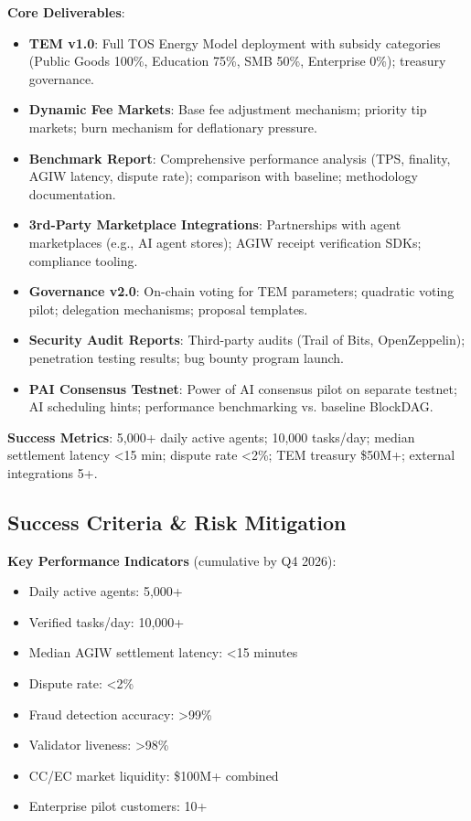 \documentclass[11pt]{article}
\begin{document}
\textbf{Core Deliverables}:
\begin{itemize}[noitemsep]
  \item \textbf{TEM v1.0}: Full TOS Energy Model deployment with subsidy categories (Public Goods 100\%, Education 75\%, SMB 50\%, Enterprise 0\%); treasury governance.
  \item \textbf{Dynamic Fee Markets}: Base fee adjustment mechanism; priority tip markets; burn mechanism for deflationary pressure.
  \item \textbf{Benchmark Report}: Comprehensive performance analysis (TPS, finality, AGIW latency, dispute rate); comparison with baseline; methodology documentation.
  \item \textbf{3rd-Party Marketplace Integrations}: Partnerships with agent marketplaces (e.g., AI agent stores); AGIW receipt verification SDKs; compliance tooling.
  \item \textbf{Governance v2.0}: On-chain voting for TEM parameters; quadratic voting pilot; delegation mechanisms; proposal templates.
  \item \textbf{Security Audit Reports}: Third-party audits (Trail of Bits, OpenZeppelin); penetration testing results; bug bounty program launch.
  \item \textbf{PAI Consensus Testnet}: Power of AI consensus pilot on separate testnet; AI scheduling hints; performance benchmarking vs. baseline BlockDAG.
\end{itemize}

\textbf{Success Metrics}: 5,000+ daily active agents; 10,000 tasks/day; median settlement latency <15 min; dispute rate <2\%; TEM treasury \$50M+; external integrations 5+.

\subsection{Success Criteria \& Risk Mitigation}

\textbf{Key Performance Indicators} (cumulative by Q4 2026):
\begin{itemize}[noitemsep]
  \item Daily active agents: 5,000+
  \item Verified tasks/day: 10,000+
  \item Median AGIW settlement latency: <15 minutes
  \item Dispute rate: <2\%
  \item Fraud detection accuracy: >99\%
  \item Validator liveness: >98\%
  \item CC/EC market liquidity: \$100M+ combined
  \item Enterprise pilot customers: 10+
\end{itemize}
\end{document}
